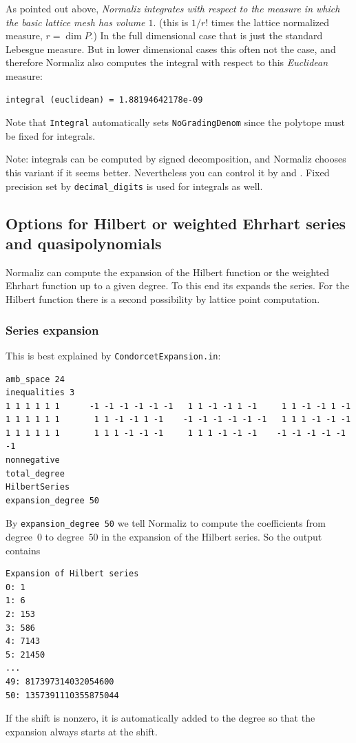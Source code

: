 As pointed out above, \emph{Normaliz integrates with respect to the measure in which the basic lattice mesh has volume $1$}. (this is $1/r!$ times the lattice normalized measure, $r=\dim P$.) In the full dimensional case that is just the standard Lebesgue measure. But in lower dimensional cases this often not the case, and therefore Normaliz also computes the integral with respect to this \emph{Euclidean} measure:
\begin{Verbatim}
integral (euclidean) = 1.88194642178e-09
\end{Verbatim}

Note that \verb|Integral| automatically sets \verb|NoGradingDenom| since the polytope must be fixed for integrals.

Note: integrals can be computed by signed decomposition, and Normaliz chooses this variant if it seems better. Nevertheless you can control it by  and . Fixed precision set by \verb|decimal_digits| is used for integrals as well.

\subsection{Options for Hilbert or weighted Ehrhart series and quasipolynomials}\label{expansion}

Normaliz can compute the expansion of the Hilbert function or the weighted Ehrhart function up to a given degree. To this end its expands the series. For the Hilbert function there is a second possibility by lattice point computation.

\subsubsection{Series expansion}
This is best explained by \verb|CondorcetExpansion.in|:
\begin{Verbatim}
amb_space 24
inequalities 3
1 1 1 1 1 1      -1 -1 -1 -1 -1 -1   1 1 -1 -1 1 -1     1 1 -1 -1 1 -1
1 1 1 1 1 1       1 1 -1 -1 1 -1    -1 -1 -1 -1 -1 -1   1 1 1 -1 -1 -1
1 1 1 1 1 1       1 1 1 -1 -1 -1     1 1 1 -1 -1 -1    -1 -1 -1 -1 -1 -1
nonnegative
total_degree
HilbertSeries
expansion_degree 50
\end{Verbatim}
By \verb|expansion_degree 50| we tell Normaliz to compute the coefficients from degree~$0$ to degree~$50$ in the expansion of the Hilbert series. So the output contains
\begin{Verbatim}
Expansion of Hilbert series
0: 1
1: 6
2: 153
3: 586
4: 7143
5: 21450
...
49: 817397314032054600
50: 1357391110355875044
\end{Verbatim}
If the shift is nonzero, it is automatically added to the degree so that the expansion always starts at the shift.

